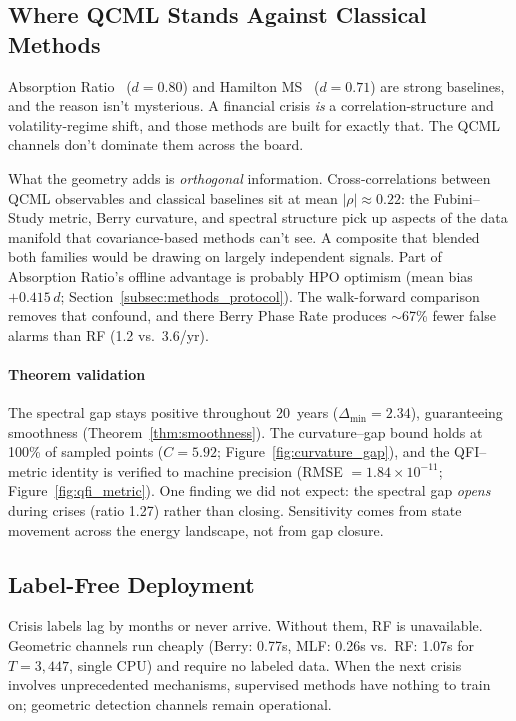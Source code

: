 \documentclass[3p]{elsarticle}
\begin{document}
\subsection{Where QCML Stands Against Classical Methods}

Absorption Ratio~\cite{kritzman2011} ($d = 0.80$) and Hamilton
MS~\cite{hamilton1989} ($d = 0.71$) are strong baselines, and the
reason isn't mysterious.  A financial crisis \emph{is} a
correlation-structure and volatility-regime shift, and those methods
are built for exactly that.  The QCML channels don't dominate them
across the board.

What the geometry adds is \emph{orthogonal} information.
Cross-correlations between QCML observables and classical baselines
sit at mean $|\rho| \approx 0.22$: the Fubini--Study metric, Berry
curvature, and spectral structure pick up aspects of the data
manifold that covariance-based methods can't see.  A composite that
blended both families would be drawing on largely independent
signals.  Part of Absorption Ratio's offline advantage is probably
HPO optimism (mean bias $+0.415\,d$;
Section~\ref{subsec:methods_protocol}).  The walk-forward comparison
removes that confound, and there Berry Phase Rate produces $\sim$67\%
fewer false alarms than RF (1.2 vs.\ 3.6/yr).

\paragraph{Theorem validation}
The spectral gap stays positive throughout 20~years
($\Delta_{\min} = 2.34$), guaranteeing smoothness
(Theorem~\ref{thm:smoothness}).  The curvature--gap bound holds at
100\% of sampled points ($C = 5.92$; Figure~\ref{fig:curvature_gap}),
and the QFI--metric identity is verified to machine precision
(RMSE $= 1.84 \times 10^{-11}$; Figure~\ref{fig:qfi_metric}).
One finding we did not expect: the spectral gap \emph{opens} during
crises (ratio 1.27) rather than closing.  Sensitivity comes from
state movement across the energy landscape, not from gap closure.

\subsection{Label-Free Deployment}

Crisis labels lag by months or never arrive.  Without them, RF is
unavailable.  Geometric channels run cheaply (Berry: 0.77s, MLF:
0.26s vs.\ RF: 1.07s for $T = 3{,}447$, single CPU) and require
no labeled data.  When the next crisis involves unprecedented
mechanisms, supervised methods have nothing to train on; geometric
detection channels remain operational.
\end{document}
